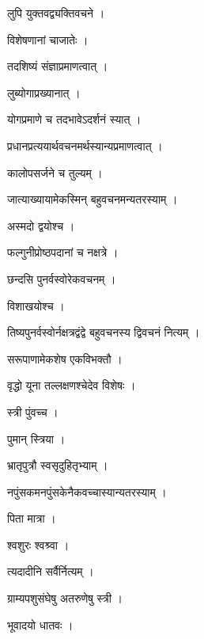 \documentclass[10pt, openany]{book}
\begin{document}
\noindent लुपि युक्तवद्व्यक्तिवचने ।

\noindent विशेषणानां चाजातेः ।

\noindent तदशिष्यं संज्ञाप्रमाणत्वात् ।

\noindent लुब्योगाप्रख्यानात् ।

\noindent योगप्रमाणे च तदभावेऽदर्शनं स्यात् ।

\noindent प्रधानप्रत्ययार्थवचनमर्थस्यान्यप्रमाणत्वात् ।

\noindent कालोपसर्जने च तुल्यम् ।

\noindent जात्याख्यायामेकस्मिन् बहुवचनमन्यतरस्याम् ।

\noindent अस्मदो द्वयोश्च ।

\noindent फल्गुनीप्रोष्ठपदानां च नक्षत्रे ।

\noindent छन्दसि पुनर्वस्वोरेकवचनम् ।

\noindent विशाखयोश्च ।

\noindent तिष्यपुनर्वस्वोर्नक्षत्रद्वंद्वे बहुवचनस्य द्विवचनं नित्यम् ।

\noindent सरूपाणामेकशेष एकविभक्तौ ।

\noindent वृद्धो यूना तल्लक्षणश्चेदेव विशेषः ।

\noindent स्त्री पुंवच्च ।

\noindent पुमान् स्त्रिया ।

\noindent भ्रातृपुत्रौ स्वसृदुहितृभ्याम् ।

\noindent नपुंसकमनपुंसकेनैकवच्चास्यान्यतरस्याम् ।

\noindent पिता मात्रा ।

\noindent श्वशुरः श्वश्र्वा ।

\noindent त्यदादीनि सर्वैर्नित्यम् ।

\noindent ग्राम्यपशुसंघेषु अतरुणेषु स्त्री ।

\noindent भूवादयो धातवः ।
\end{document}
